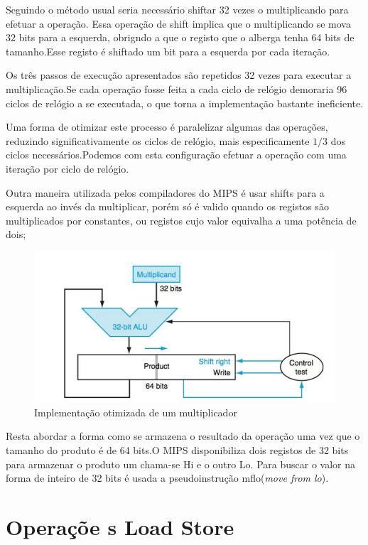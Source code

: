 \documentclass[10pt,a4paper]{book}
\begin{document}
		Seguindo o método usual seria necessário shiftar 32 vezes o multiplicando para efetuar a operação. Essa operação de shift implica que o multiplicando se mova 32 bits para a esquerda, obrigndo a que o registo que o alberga tenha 64 bits de tamanho.Esse registo é shiftado um bit para a esquerda por cada iteração.

		Os três passos de execução apresentados são repetidos 32 vezes para executar a multiplicação.Se cada operação fosse feita a cada ciclo de relógio demoraria 96 ciclos de relógio a se executada, o que torna a implementação bastante ineficiente.

		Uma forma de otimizar este processo é paralelizar algumas das operações, reduzindo significativamente os ciclos de relógio, mais especificamente $1/3$ dos ciclos necessários.Podemos com esta configuração efetuar a operação com uma iteração por ciclo de relógio.

		Outra maneira utilizada pelos compiladores do MIPS é usar shifts para a esquerda ao invés da multiplicar, porém só é valido quando os registos são multiplicados por constantes, ou registos cujo valor equivalha a uma potência de dois;

   			\begin{figure}[htp]
			    \centering
			    \includegraphics[scale=0.5]{mul2.png}
			    \caption{Implementação otimizada de um multiplicador}
			    \label{mul2}
			\end{figure}

		Resta abordar a forma como se armazena o resultado da operação uma vez que o tamanho do produto é de 64 bits.O MIPS disponibiliza dois registos de 32 bits para armazenar o produto um chama-se Hi e o outro Lo. Para buscar o valor na forma de inteiro de 32 bits é usada a pseudoinstrução mflo(\textit{move from lo}).




	\section{Operaçõe s Load Store}
\end{document}
